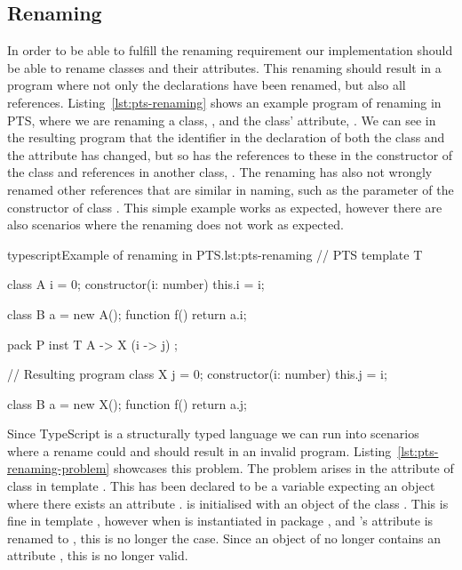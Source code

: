\subsection{Renaming}\label{subsec:pts-renaming}

In order to be able to fulfill the renaming requirement our implementation should be able to rename classes and their attributes.
This renaming should result in a program where not only the declarations have been renamed, but also all references.
Listing~\vref{lst:pts-renaming} shows an example program of renaming in PTS, where we are renaming a class, , and the class' attribute, .
We can see in the resulting program that the identifier in the declaration of both the class and the attribute has changed, but so has the references to these in the constructor of the class and references in another class, \@.
The renaming has also not wrongly renamed other references that are similar in naming, such as the parameter of the constructor of class \@.
This simple example works as expected, however there are also scenarios where the renaming does not work as expected.

\begin{code}{typescript}{Example of renaming in PTS.}{lst:pts-renaming}
    // PTS
    template T {
        class A {
            i = 0;
            constructor(i: number) {
                this.i = i;
            }
        }

        class B {
            a = new A();
            function f() {
                return a.i;
            }
        }
    }

    pack P {
        inst T { A -> X (i -> j) };
    }

    // Resulting program
    class X {
        j = 0;
        constructor(i: number) {
            this.j = i;
        }
    }

    class B {
        a = new X();
        function f() {
            return a.j;
        }
    }
\end{code}

Since TypeScript is a structurally typed language we can run into scenarios where a rename could and should result in an invalid program.
Listing~\vref{lst:pts-renaming-problem} showcases this problem.
The problem arises in the  attribute of class  in template .
This has been declared to be a variable expecting an object where there exists an attribute .
 is initialised with an object of the class .
This is fine in template , however when  is instantiated in package , and 's attribute  is renamed to , this is no longer the case.
Since an object of  no longer contains an attribute , this is no longer valid.

